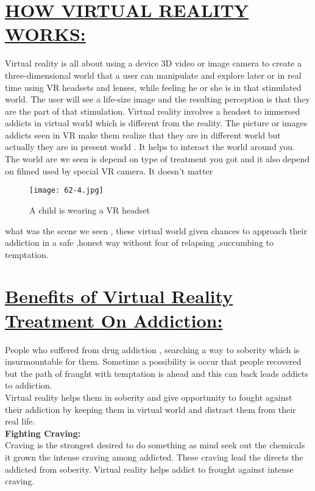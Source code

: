 \documentclass[12pts]{article}
\begin{document}
\section*{\underline{HOW VIRTUAL REALITY WORKS:
}}
\begin{large}
\begin{flushleft}
Virtual reality is all about using a device 3D video or image camera to create a three-dimensional world that a user can manipulate and explore later or in real time using VR headsets and lenses, while feeling he or she is in that stimulated world. The user will see a life-size image and the resulting perception is that they are the part of that stimulation. Virtual reality involves a headset to immersed addicts in virtual world which is different from the reality. The 
picture or images addicts seen in VR make them realize that they are in different world but actually they are in present world . It helps to interact the 
world around you. The world are we seen is depend on type of treatment you got and it also depend on filmed used by special VR camera. It doesn’t matter 


\begin{figure}[h]
\centering
\texttt{[image: 62-4.jpg]}
\caption{A child is wearing a VR headset}
\end{figure}
what was the scene we seen , these virtual world given chances to approach 
their addiction in a safe ,honest way without fear of relapsing ,succumbing to 
temptation.
\end{flushleft}
\end{large}

\section*{\underline{Benefits of Virtual Reality Treatment 
On Addiction:}}
\begin{large}
\begin{flushleft}
People who suffered from drug addiction , searching a way to soberity which is insurmountable for them. Sometime a possibility is occur that people recovered but the path of fraught with temptation is ahead and this can back leads addicts to addiction.\\
Virtual reality helps them in soberity and give opportunity to fought against their addiction by keeping them in virtual world and distract them from their real life.\\
\vspace*{1cm}
\textbf{Fighting Craving:}\\
Craving is the strongest desired to do something as mind seek out the chemicals it grown the intense craving among addicted. These craving lead the 
directs the addicted from soberity. Virtual reality helps addict to frought against intense craving.
\end{flushleft}
\end{large}
\end{document}
